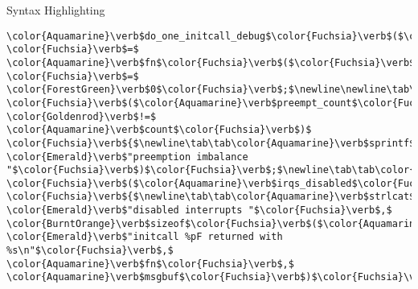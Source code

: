 \begin{frame}{Syntax Highlighting}
\begin{verbatim}
\color{Aquamarine}\verb$do_one_initcall_debug$\color{Fuchsia}\verb$($\color{Aquamarine}\verb$fn$\color{Fuchsia}\verb$)$\color{Fuchsia}\verb$;$\newline\tab\color{BurntOrange}\verb$else$\newline\tab\tab\color{Aquamarine}\verb$ret$ \color{Fuchsia}\verb$=$ \color{Aquamarine}\verb$fn$\color{Fuchsia}\verb$($\color{Fuchsia}\verb$)$\color{Fuchsia}\verb$;$\newline\newline\tab\color{Aquamarine}\verb$msgbuf$\color{Fuchsia}\verb$[$\color{ForestGreen}\verb$0$\color{Fuchsia}\verb$]$ \color{Fuchsia}\verb$=$ \color{ForestGreen}\verb$0$\color{Fuchsia}\verb$;$\newline\newline\tab\color{BurntOrange}\verb$if$ \color{Fuchsia}\verb$($\color{Aquamarine}\verb$preempt_count$\color{Fuchsia}\verb$($\color{Fuchsia}\verb$)$ \color{Goldenrod}\verb$!=$ \color{Aquamarine}\verb$count$\color{Fuchsia}\verb$)$ \color{Fuchsia}\verb${$\newline\tab\tab\color{Aquamarine}\verb$sprintf$\color{Fuchsia}\verb$($\color{Aquamarine}\verb$msgbuf$\color{Fuchsia}\verb$,$ \color{Emerald}\verb$"preemption imbalance "$\color{Fuchsia}\verb$)$\color{Fuchsia}\verb$;$\newline\tab\tab\color{Aquamarine}\verb$preempt_count_set$\color{Fuchsia}\verb$($\color{Aquamarine}\verb$count$\color{Fuchsia}\verb$)$\color{Fuchsia}\verb$;$\newline\tab\color{Fuchsia}\verb$}$\newline\tab\color{BurntOrange}\verb$if$ \color{Fuchsia}\verb$($\color{Aquamarine}\verb$irqs_disabled$\color{Fuchsia}\verb$($\color{Fuchsia}\verb$)$\color{Fuchsia}\verb$)$ \color{Fuchsia}\verb${$\newline\tab\tab\color{Aquamarine}\verb$strlcat$\color{Fuchsia}\verb$($\color{Aquamarine}\verb$msgbuf$\color{Fuchsia}\verb$,$ \color{Emerald}\verb$"disabled interrupts "$\color{Fuchsia}\verb$,$ \color{BurntOrange}\verb$sizeof$\color{Fuchsia}\verb$($\color{Aquamarine}\verb$msgbuf$\color{Fuchsia}\verb$)$\color{Fuchsia}\verb$)$\color{Fuchsia}\verb$;$\newline\tab\tab\color{Aquamarine}\verb$local_irq_enable$\color{Fuchsia}\verb$($\color{Fuchsia}\verb$)$\color{Fuchsia}\verb$;$\newline\tab\color{Fuchsia}\verb$}$\newline\tab\color{Aquamarine}\verb$WARN$\color{Fuchsia}\verb$($\color{Aquamarine}\verb$msgbuf$\color{Fuchsia}\verb$[$\color{ForestGreen}\verb$0$\color{Fuchsia}\verb$]$\color{Fuchsia}\verb$,$ \color{Emerald}\verb$"initcall %pF returned with %s\n"$\color{Fuchsia}\verb$,$ \color{Aquamarine}\verb$fn$\color{Fuchsia}\verb$,$ \color{Aquamarine}\verb$msgbuf$\color{Fuchsia}\verb$)$\color{Fuchsia}\verb$;$\newline\newline\tab\color{Aquamarine}\verb$add_latent_entropy$\color{Fuchsia}\verb$($\color{Fuchsia}\verb$)$\color{Fuchsia}\verb$;$\newline\tab\color{BurntOrange}\verb$return$ 
\end{verbatim}
\end{frame}
